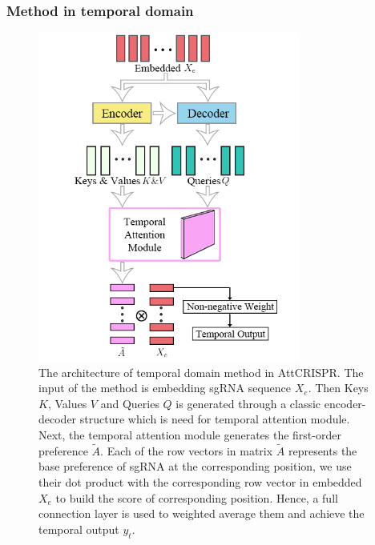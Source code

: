 \documentclass{bioinfo}
\begin{document}
\subsubsection{Method in temporal domain}
\begin{figure}[tpb]%
    \centerline{\includegraphics[width=86mm]{temporalmodule.png}}
    \caption{The architecture of temporal domain method in AttCRISPR. 
    The input of the method is embedding sgRNA sequence $X_e$. 
    Then Keys $K$, Values $V$ and Queries $Q$ is generated through a classic encoder-decoder structure which is need for temporal attention module.
    Next, the temporal attention module generates the first-order preference $\tilde{A}$. 
    Each of the row vectors in matrix $\tilde{A}$ represents the base preference of sgRNA at the corresponding position, we use their dot product with the corresponding row vector in embedded $X_e$ to build the score of corresponding position. 
    Hence, a full connection layer is used to weighted average them and achieve the temporal output $y_t$.
    }\label{fig:04}
\end{figure}
\end{document}
